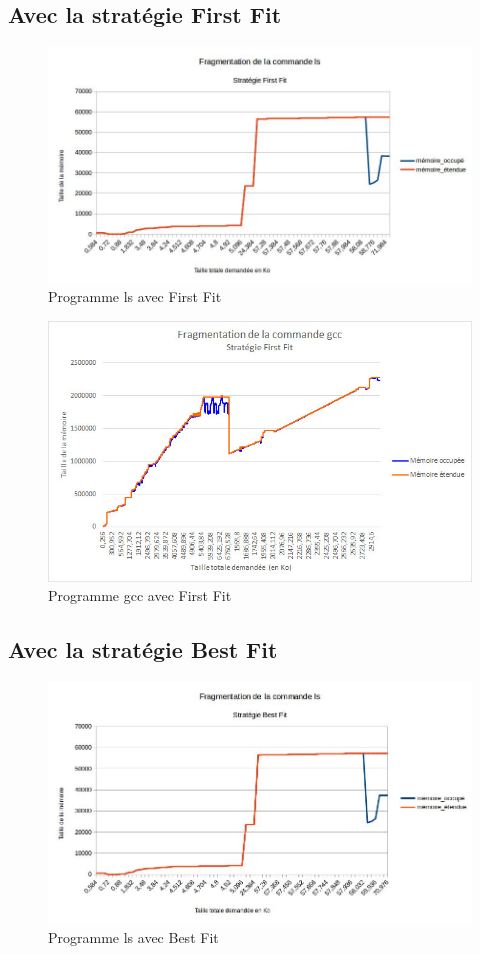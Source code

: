 \documentclass{article}
\begin{document}
\newpage
\subsection{Avec la stratégie First Fit}

\begin{figure}[h]
	\centering
	\includegraphics[width=14cm]{ls_firstfit.jpg}
	\caption{Programme ls avec First Fit}
\end{figure}

\begin{figure}[h]
	\centering
	\includegraphics[width=12cm]{gcc_firstfit.jpg}
	\caption{Programme gcc avec First Fit}
\end{figure}

\newpage
\subsection{Avec la stratégie Best Fit}
\begin{figure}[h]
	\centering
	\includegraphics[width=14cm]{ls_bestfit.jpg}
	\caption{Programme ls avec Best Fit}
\end{figure}
\end{document}
